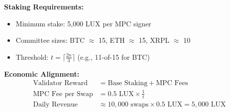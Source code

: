 \textbf{Staking Requirements:}
\begin{itemize}
\item Minimum stake: 5,000 LUX per MPC signer
\item Committee sizes: BTC $\approx$ 15, ETH $\approx$ 15, XRPL $\approx$ 10
\item Threshold: $t = \lceil \frac{2n}{3} \rceil$ (e.g., 11-of-15 for BTC)
\end{itemize}

\textbf{Economic Alignment:}
\begin{align}
\text{Validator Reward} &= \text{Base Staking} + \text{MPC Fees} \\
\text{MPC Fee per Swap} &= 0.5 \text{ LUX} \times \frac{1}{t} \\
\text{Daily Revenue} &\approx 10{,}000 \text{ swaps} \times 0.5 \text{ LUX} = 5{,}000 \text{ LUX}
\end{align}

